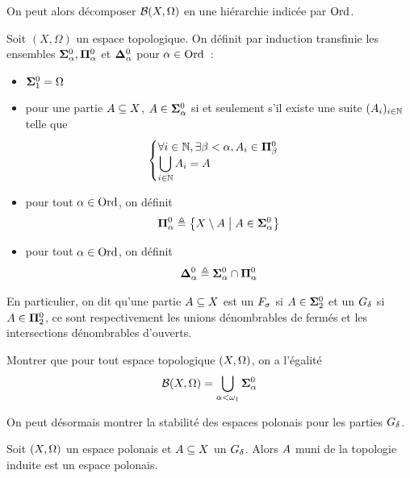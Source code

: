 \noindent
On peut alors décomposer $\mathcal{B}(X,\Omega)$ en une hiérarchie indicée par
$\operatorname{Ord}$.

\begin{definition}
  Soit $(X,\Omega)$ un espace topologique. On définit par induction transfinie
  les ensembles $\bm{\Sigma}^0_{\alpha},\bm{\Pi}^0_{\alpha}$ et
  $\bm{\Delta}^0_{\alpha}$ pour $\alpha \in \operatorname{Ord}$~:
  \begin{itemize}
  \item $\bm{\Sigma}^0_{1} = \Omega$
  \item pour une partie $A\subseteq X$, $A\in\bm{\Sigma}^0_{\alpha}$ si et
    seulement s'il existe une suite $(A_i)_{i\in\mathbb N}$ telle que
    \[\begin{cases}
    \forall i \in \mathbb N, \exists \beta < \alpha, A_i \in \bm{\Pi}^0_{\beta}\\
    \displaystyle\bigcup_{i\in\mathbb N} A_i = A
    \end{cases}\]
  \item pour tout $\alpha \in \operatorname{Ord}$, on définit
    \[\bm{\Pi}^0_{\alpha} \triangleq
    \left\{ X\setminus A \;\middle\vert\; A \in \bm{\Sigma}^0_{\alpha} \right\}\]
  \item pour tout $\alpha \in \operatorname{Ord}$, on définit
    \[\bm{\Delta}^0_{\alpha}\triangleq \bm{\Sigma}^0_{\alpha}\cap\bm{\Pi}^0_{\alpha}\]
  \end{itemize}

  En particulier, on dit qu'une partie $A\subseteq X$ est un $F_{\sigma}$ si
  $A\in\bm{\Sigma}^0_{2}$ et un $G_{\delta}$ si $A\in\bm{\Pi}^0_{2}$, ce sont
  respectivement les unions dénombrables de fermés et les intersections
  dénombrables d'ouverts.
\end{definition}

\begin{exercise}
  Montrer que pour tout espace topologique $(X,\Omega)$, on a l'égalité
  \[\mathcal{B}(X,\Omega) = \bigcup_{\alpha < \omega_1} \bm{\Sigma}^0_{\alpha}\]
\end{exercise}

On peut désormais montrer la stabilité des espaces polonais pour les parties
$G_{\delta}$.

\begin{proposition}
  Soit $(X,\Omega)$ un espace polonais et $A\subseteq X$ un $G_{\delta}$. Alors
  $A$ muni de la topologie induite est un espace polonais.
\end{proposition}


